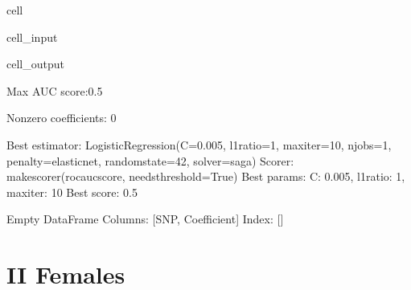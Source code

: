 \documentclass[letterpaper,10pt,english]{jupyterBook}
\begin{document}
\begin{sphinxuseclass}{cell}
\begin{sphinxVerbatimInput}
\begin{sphinxuseclass}{cell_input}
\end{sphinxuseclass}\end{sphinxVerbatimInput}
\begin{sphinxVerbatimOutput}

\begin{sphinxuseclass}{cell_output}
\begin{sphinxVerbatim}[commandchars=\\\{\}]
Max AUC score:0.5

Non\PYGZhy{}zero coefficients: 0

Best estimator: LogisticRegression(C=0.005, l1\PYGZus{}ratio=1, max\PYGZus{}iter=10, n\PYGZus{}jobs=\PYGZhy{}1,
                   penalty=\PYGZsq{}elasticnet\PYGZsq{}, random\PYGZus{}state=42, solver=\PYGZsq{}saga\PYGZsq{})
Scorer: make\PYGZus{}scorer(roc\PYGZus{}auc\PYGZus{}score, needs\PYGZus{}threshold=True)
Best params: \PYGZob{}\PYGZsq{}C\PYGZsq{}: 0.005, \PYGZsq{}l1\PYGZus{}ratio\PYGZsq{}: 1, \PYGZsq{}max\PYGZus{}iter\PYGZsq{}: 10\PYGZcb{}
Best score: 0.5
\end{sphinxVerbatim}

\begin{sphinxVerbatim}[commandchars=\\\{\}]
Empty DataFrame
Columns: [SNP, Coefficient]
Index: []
\end{sphinxVerbatim}

\end{sphinxuseclass}\end{sphinxVerbatimOutput}

\end{sphinxuseclass}

\section{II Females}
\label{\detokenize{Cooper:ii-females}}
\end{document}
